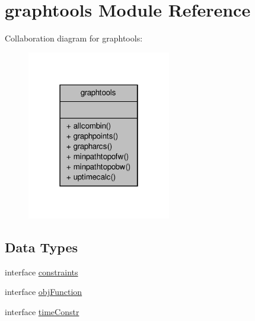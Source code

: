 \hypertarget{classgraphtools}{\section{graphtools Module Reference}
\label{classgraphtools}
}


Collaboration diagram for graphtools\-:
\nopagebreak
\begin{figure}[H]
\begin{center}
\leavevmode
\includegraphics[width=178pt]{classgraphtools__coll__graph}
\end{center}
\end{figure}
\subsection*{Data Types}
\begin{DoxyCompactItemize}
\item 
interface \hyperlink{interfacegraphtools_1_1constraints}{constraints}
\item 
interface \hyperlink{interfacegraphtools_1_1obj_function}{obj\-Function}
\item 
interface \hyperlink{interfacegraphtools_1_1time_constr}{time\-Constr}
\end{DoxyCompactItemize}

